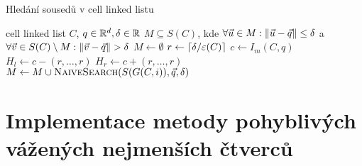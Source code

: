 \begin{algorithm}[!ht]
  \caption{Hledání sousedů v cell linked listu}
  \label{algo:cll-search-impl}
  \begin{algorithmic}
    \Require cell linked list $C$, $q \in \mathbb{R}^d, \delta \in \mathbb{R}$
    \Ensure $M \subseteq S(C)$, kde $\forall \vec{u} \in M: \|\vec{u} - \vec{q}\| \leq \delta$ a $\forall \vec{v} \in S(C) \setminus M: \|\vec{v} - \vec{q}\| > \delta$
    \State $M \leftarrow \emptyset$
    \State $r \leftarrow \lceil\delta/\varepsilon(C)\rceil$
    \State $c \leftarrow I_m(C, q)$
    \State $H_l \leftarrow c - (r, \ldots, r)$
    \State $H_r \leftarrow c + (r, \ldots, r)$
        \State $M \leftarrow M \cup \Call{NaiveSearch}{S(G(C, i)), \vec{q}, \delta}$
      \EndIf
    \EndFor
    \State {}
  \end{algorithmic}
\end{algorithm}

\section{Implementace metody pohyblivých vážených nejmenších čtverců}

